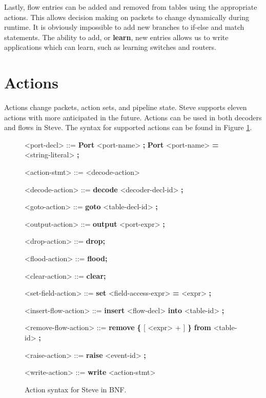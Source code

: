 Lastly, flow entries can be added and removed from tables using the appropriate actions. This allows decision making on packets to change dynamically during runtime. It is obviously impossible to add new branches to if-else and match statements. The ability to add, or \textbf{learn}, new entries allows us to write applications which can learn, such as learning switches and routers.

\section{Actions} \label{action_tut}

Actions change packets, action sets, and pipeline state. Steve supports eleven actions with more anticipated in the future. Actions can be used in both decoders and flows in Steve. The syntax for supported actions can be found in Figure \ref{fg:action_syntax}.

\begin{figure}
\begin{mdframed}
\begin{grammar}
<port-decl> ::=
\textbf{Port} <port-name> \textbf{;}
\alt \textbf{Port} <port-name> \textbf{=} <string-literal> \textbf{;}

<action-stmt> ::=
<decode-action>

<decode-action> ::=
\textbf{decode} <decoder-decl-id> \textbf{;}

<goto-action> ::=
\textbf{goto} <table-decl-id> \textbf{;}

<output-action> ::=
\textbf{output} <port-expr> \textbf{;}

<drop-action> ::= \textbf{drop;}

<flood-action> ::= \textbf{flood;}

<clear-action> ::= \textbf{clear;}

<set-field-action> ::= \textbf{set} <field-access-expr> \textbf{=} <expr> \textbf{;}

<insert-flow-action> ::= \textbf{insert} <flow-decl> \textbf{into} <table-id> \textbf{;}

<remove-flow-action> ::= \textbf{remove} \textbf{\{} [ <expr> + ] \textbf{\}}
\textbf{from} <table-id> \textbf{;}

<raise-action> ::= \textbf{raise} <event-id> \textbf{;}

<write-action> ::= \textbf{write} <action-stmt>

\end{grammar}
\end{mdframed}
\caption{Action syntax for Steve in BNF.}
\label{fg:action_syntax}
\end{figure}

